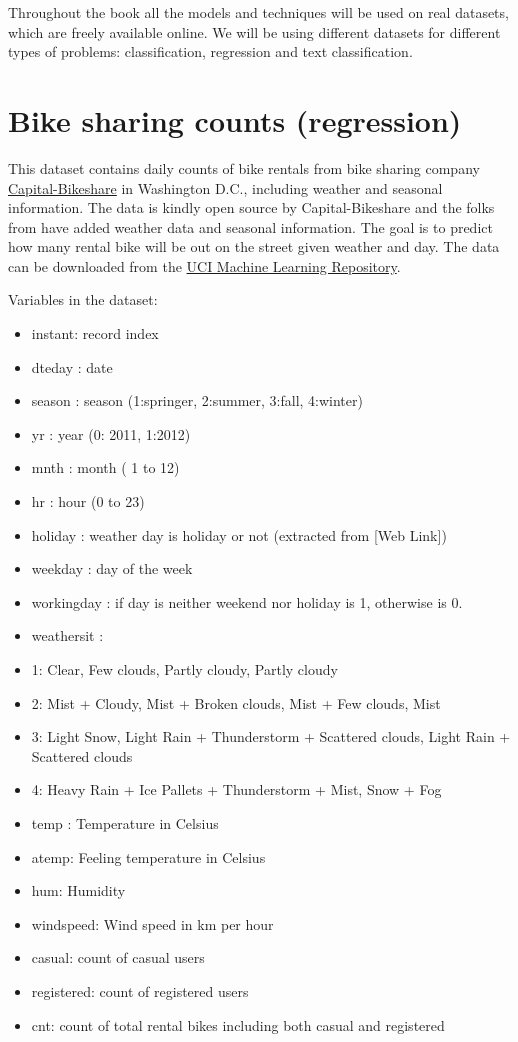 \documentclass[12pt,]{krantz}
\providecommand{\tightlist}{%
  \setlength{\itemsep}{0pt}\setlength{\parskip}{0pt}}
\theoremstyle{definition}
\theoremstyle{definition}
\theoremstyle{definition}
\theoremstyle{remark}
\begin{document}
Throughout the book all the models and techniques will be used on real
datasets, which are freely available online. We will be using different
datasets for different types of problems: classification, regression and
text classification.

\section{Bike sharing counts (regression)}\label{bike.data}

This dataset contains daily counts of bike rentals from bike sharing
company \href{https://www.capitalbikeshare.com/}{Capital-Bikeshare} in
Washington D.C., including weather and seasonal information. The data is
kindly open source by Capital-Bikeshare and the folks from
\citep{bike2013} have added weather data and seasonal information. The
goal is to predict how many rental bike will be out on the street given
weather and day. The data can be downloaded from the
\href{http://archive.ics.uci.edu/ml/datasets/Bike+Sharing+Dataset}{UCI
Machine Learning Repository}.

Variables in the dataset:

\begin{itemize}
\tightlist
\item
  instant: record index
\item
  dteday : date
\item
  season : season (1:springer, 2:summer, 3:fall, 4:winter)
\item
  yr : year (0: 2011, 1:2012)
\item
  mnth : month ( 1 to 12)
\item
  hr : hour (0 to 23)
\item
  holiday : weather day is holiday or not (extracted from {[}Web
  Link{]})
\item
  weekday : day of the week
\item
  workingday : if day is neither weekend nor holiday is 1, otherwise is
  0.
\item
  weathersit :
\item
  1: Clear, Few clouds, Partly cloudy, Partly cloudy
\item
  2: Mist + Cloudy, Mist + Broken clouds, Mist + Few clouds, Mist
\item
  3: Light Snow, Light Rain + Thunderstorm + Scattered clouds, Light
  Rain + Scattered clouds
\item
  4: Heavy Rain + Ice Pallets + Thunderstorm + Mist, Snow + Fog
\item
  temp : Temperature in Celsius
\item
  atemp: Feeling temperature in Celsius
\item
  hum: Humidity
\item
  windspeed: Wind speed in km per hour
\item
  casual: count of casual users
\item
  registered: count of registered users
\item
  cnt: count of total rental bikes including both casual and registered
\end{itemize}
\end{document}
